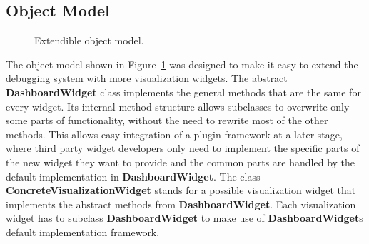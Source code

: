 \subsection{Object Model}
\label{object_model_section}

\begin{figure}%
  \centering
  \caption{Extendible object model.}
  \label{class overview}
\end{figure}

The object model shown in Figure~\ref{class overview} was designed to make it easy to extend the debugging system with more visualization widgets. The abstract \textbf{DashboardWidget} class implements the general methods that are the same for every widget. Its internal method structure allows subclasses to overwrite only some parts of functionality, without the need to rewrite most of the other methods. This allows easy integration of a plugin framework at a later stage, where third party widget developers only need to implement the specific parts of the new widget they want to provide and the common parts are handled by the default implementation in \textbf{DashboardWidget}. The class \textbf{ConcreteVisualizationWidget} stands for a possible visualization widget that implements the abstract methods from \textbf{DashboardWidget}. Each visualization widget has to subclass \textbf{DashboardWidget} to make use of \textbf{DashboardWidget}s default implementation framework.

